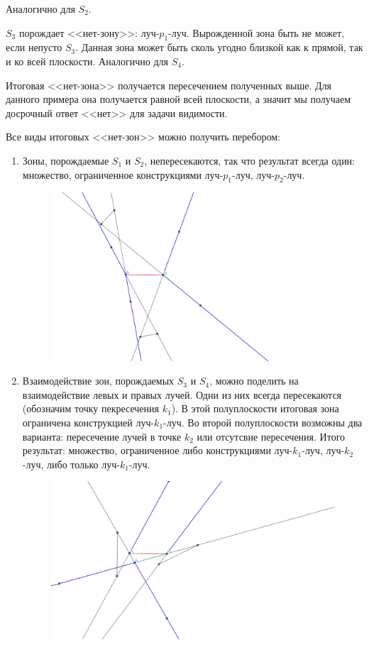 \documentclass[letterpaper,12pt]{article}
\begin{document}
Аналогично для $S_2$.
\par
$S_3$ порождает <<нет-зону>>: луч-$p_1$-луч. 
Вырожденной зона быть не может, если непусто $S_3$.
Данная зона может быть сколь угодно близкой как к прямой,
так и ко всей плоскости.
Аналогично для $S_4$.
\par
Итоговая <<нет-зона>> получается пересечением полученных выше.
Для данного примера она получается равной всей плоскости, а
значит мы получаем досрочный ответ <<нет>> для задачи видимости.
\par
Все виды итоговых <<нет-зон>> можно получить перебором:
\begin{enumerate}
      \item Зоны, порождаемые $S_1$ и $S_2$, непересекаются, 
            так что результат всегда один: множество, 
            ограниченное конструкциями луч-$p_1$-луч, 
            луч-$p_2$-луч.
            \begin{figure}[H]
                  \centering
                  \includegraphics[width=0.5\linewidth]{nozone_2_1.png}
            \end{figure}
      \item Взаимодействие зон, порождаемых $S_3$ и $S_4$, 
            можно поделить на взаимодействие левых и правых
            лучей. Одни из них всегда пересекаются (обозначим
            точку пекресечения $k_1$). В этой полуплоскости
            итоговая зона ограничена конструкцией
            луч-$k_1$-луч. Во второй полуплоскости возможны два
            варианта: пересечение лучей в точке $k_2$ или
            отсутсвие пересечения. Итого результат: множество, 
            ограниченное либо конструкциями луч-$k_1$-луч, 
            луч-$k_2$-луч, либо только луч-$k_1$-луч.
            \begin{figure}[H]
                  \centering
                  \includegraphics[width=0.5\linewidth]{nozone_2_2.png}

\end{figure}
\end{enumerate}
\end{document}
